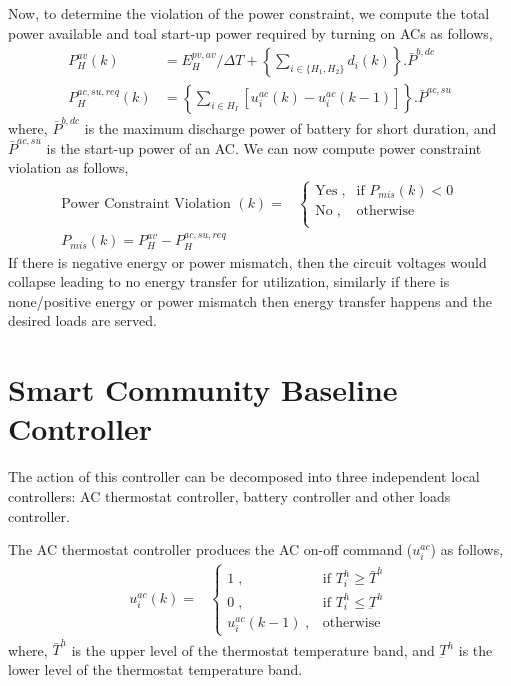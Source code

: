 \documentclass[11pt,usenames]{article}
\begin{document}
Now, to determine the violation of the power constraint, we compute the  total power available and toal start-up power required by turning on ACs as follows,
\begin{align}	
	P_{H}^{av}(k) &= E_{H}^{pv,av}/ \Delta T + \left\lbrace \sum_{i \in \{H_{1},H_{2}\}} d_{i}(k) \right\rbrace  . \bar P^{b,dc}\\
	P_{H}^{ac,su,req}(k) &= \left\lbrace \sum_{i \in H_{I}}\left[ u_{i}^{ac}(k) - u_{i}^{ac}(k-1) \right]  \right\rbrace . \bar P^{ac,su} 
\end{align}
where, $\bar P^{b,dc}$ is the maximum discharge power of battery for short duration, and $\bar P^{ac,su} $ is the start-up power of an AC. We can now compute power constraint violation as follows,
\begin{align}
	\text{Power Constraint Violation }(k)= & 
	\begin{cases}
		\text{Yes} \; , & \text{if } P_{mis}(k)<0  \\
		\text{No} \; , & \text{otherwise} \\
	\end{cases}\\
	P_{mis}(k)=P_{H}^{av}-P_{H}^{ac,su,req}
\end{align}
If there is negative energy or power mismatch, then the circuit voltages would collapse leading to no energy transfer for utilization, similarly if there is none/positive energy or power mismatch then energy transfer happens and the desired loads are served.

\newpage

\section{Smart Community Baseline Controller}\label{section:BaselineController}
The action of this controller can be decomposed into three independent local controllers: AC thermostat controller, battery controller and other loads controller.

The AC thermostat controller produces the AC on-off command ($u_{i}^{ac}$) as follows,
\begin{align}
	u_{i}^{ac}(k)= & 
	\begin{cases}
		1 \; , & \text{if } T_{i}^{h}\geq \bar T^{h} \\
		0 \; , & \text{if } T_{i}^{h}\leq \underbar T^{h} \\
		u_{i}^{ac}(k-1) \; , & \text{otherwise } 
	\end{cases}
\end{align}
where, $\bar T^{h}$ is the upper level of the thermostat temperature band, and $\underbar T^{h}$ is the lower level of the thermostat temperature band.
\end{document}
